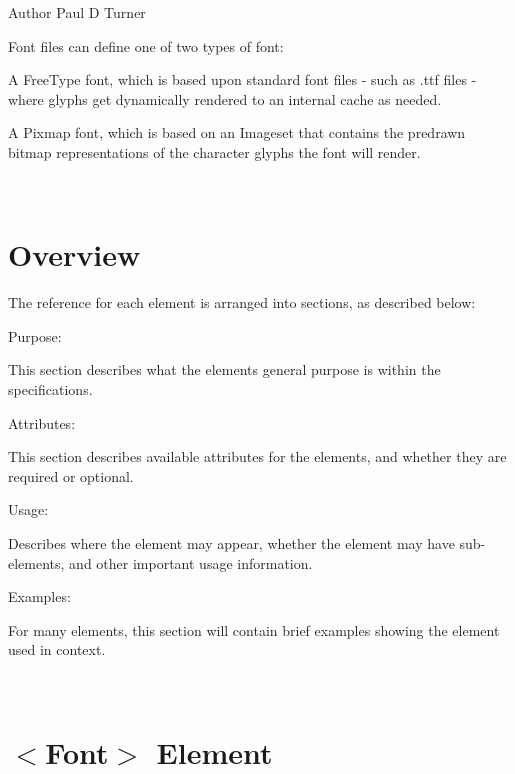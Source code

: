 \begin{DoxyAuthor}{Author}
Paul D Turner
\end{DoxyAuthor}
Font files can define one of two types of font\+:
\begin{DoxyItemize}
\item A Free\+Type font, which is based upon standard font files -\/ such as .ttf files -\/ where glyphs get dynamically rendered to an internal cache as needed.
\item A Pixmap font, which is based on an Imageset that contains the predrawn bitmap representations of the character glyphs the font will render.
\end{DoxyItemize}

~\newline
 \hypertarget{xml_font_xml_font_overview}{}\section{Overview}\label{xml_font_xml_font_overview}
The reference for each element is arranged into sections, as described below\+:
\begin{DoxyItemize}
\item Purpose\+:
\begin{DoxyItemize}
\item This section describes what the elements general purpose is within the specifications.
\end{DoxyItemize}
\item Attributes\+:
\begin{DoxyItemize}
\item This section describes available attributes for the elements, and whether they are required or optional.
\end{DoxyItemize}
\item Usage\+:
\begin{DoxyItemize}
\item Describes where the element may appear, whether the element may have sub-\/elements, and other important usage information.
\end{DoxyItemize}
\item Examples\+:
\begin{DoxyItemize}
\item For many elements, this section will contain brief examples showing the element used in context.
\end{DoxyItemize}
\end{DoxyItemize}

~\newline
 \hypertarget{xml_font_xml_font_font}{}\section{$<$\+Font$>$ Element}\label{xml_font_xml_font_font}

